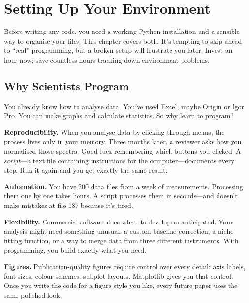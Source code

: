 
\chapter{Setting Up Your Environment}
\label{chap:setup}

Before writing any code, you need a working Python installation and a sensible way to organise your files. This chapter covers both. It's tempting to skip ahead to ``real'' programming, but a broken setup will frustrate you later. Invest an hour now; save countless hours tracking down environment problems.

\section{Why Scientists Program}
\label{sec:why-program}

You already know how to analyse data. You've used Excel, maybe Origin or Igor Pro. You can make graphs and calculate statistics. So why learn to program?

\textbf{Reproducibility.} When you analyse data by clicking through menus, the process lives only in your memory. Three months later, a reviewer asks how you normalised those spectra. Good luck remembering which buttons you clicked. A \emph{script}---a text file containing instructions for the computer---documents every step. Run it again and you get exactly the same result.

\textbf{Automation.} You have 200 data files from a week of measurements. Processing them one by one takes hours. A script processes them in seconds---and doesn't make mistakes at file 187 because it's tired.

\textbf{Flexibility.} Commercial software does what its developers anticipated. Your analysis might need something unusual: a custom baseline correction, a niche fitting function, or a way to merge data from three different instruments. With programming, you build exactly what you need.

\textbf{Figures.} Publication-quality figures require control over every detail: axis labels, font sizes, colour schemes, subplot layouts. Matplotlib gives you that control. Once you write the code for a figure style you like, every future paper uses the same polished look.

